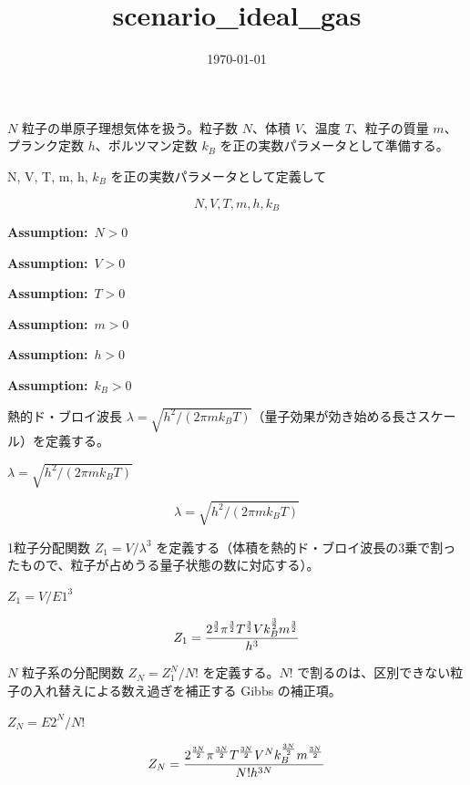 \documentclass[dvipdfmx,a4paper,11pt]{jsarticle}
\title{scenario\_ideal\_gas}
\date{\today}
\begin{document}
\maketitle

$N$ 粒子の単原子理想気体を扱う。粒子数 $N$、体積 $V$、温度 $T$、粒子の質量 $m$、プランク定数 $h$、ボルツマン定数 $k_B$ を正の実数パラメータとして準備する。

N, V, T, m, h, $k_B$ を正の実数パラメータとして定義して

\[
  N, V, T, m, h, k_B
\]

\noindent\textbf{Assumption:}\ $\displaystyle N > 0$\par

\noindent\textbf{Assumption:}\ $\displaystyle V > 0$\par

\noindent\textbf{Assumption:}\ $\displaystyle T > 0$\par

\noindent\textbf{Assumption:}\ $\displaystyle m > 0$\par

\noindent\textbf{Assumption:}\ $\displaystyle h > 0$\par

\noindent\textbf{Assumption:}\ $\displaystyle k_B > 0$\par

熱的ド・ブロイ波長 $\lambda=\sqrt{h^2/(2\pi mk_BT)}$（量子効果が効き始める長さスケール）を定義する。

$\lambda = \sqrt{h^2 / (2 \pi m k_B T)}$

\begin{equation}
  \lambda = \sqrt{h^2 / (2 \pi m k_B T)}
  \label{eq:E1}
\end{equation}

1粒子分配関数 $Z_1=V/\lambda^3$ を定義する（体積を熱的ド・ブロイ波長の3乗で割ったもので、粒子が占めうる量子状態の数に対応する）。

$Z_1 = V / E1^3$

\begin{equation}
  Z_1 = {{2^{\frac{3}{2}} \pi^{\frac{3}{2}} T^{\frac{3}{2}} V k_{B}^{\frac{3}{2}} m^{\frac{3}{2}}}\over{h^3}}
  \label{eq:E2}
\end{equation}

$N$ 粒子系の分配関数 $Z_N=Z_1^N/N!$ を定義する。$N!$ で割るのは、区別できない粒子の入れ替えによる数え過ぎを補正する Gibbs の補正項。

$Z_N = E2^N / N!$

\begin{equation}
  Z_N = {{2^{\frac{3 N}{2}} \pi^{\frac{3 N}{2}} T^{\frac{3 N}{2}} V^{N} k_{B}^{\frac{3 N}{2}} m^{\frac{3 N}{2}}}\over{N! h^{3 N}}}
  \label{eq:E3}
\end{equation}
\end{document}
